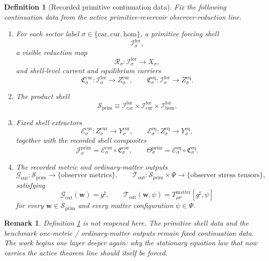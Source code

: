 \documentclass[11pt]{article}
\newcommand{\CompletedMetric}{g^{\sharp}}
\newcommand{\Car}{\mathrm{car}}
\newcommand{\Cur}{\mathrm{cur}}
\newcommand{\Hom}{\mathrm{hom}}
\newcommand{\ForSpace}[1]{\mathcal I_{#1}^{\mathrm{for}}}
\newcommand{\PrimShell}{\mathcal S_{\mathrm{prim}}}
\newcommand{\Reduction}[1]{\mathcal R_{#1}}
\newcommand{\CurrentCarrier}[1]{\mathfrak C_{#1}^{\mathrm{cur}}}
\newcommand{\EqCarrier}[1]{\mathfrak C_{#1}^{\mathrm{eq}}}
\newcommand{\CurrentExtract}[1]{\mathscr E_{#1}^{\mathrm{cur}}}
\newcommand{\EqExtract}[1]{\mathscr E_{#1}^{\mathrm{eq}}}
\newcommand{\PrimCurrent}[1]{\mathcal J_{#1}^{\mathrm{prim}}}
\newcommand{\PrimTheta}[1]{\Theta_{#1}^{\mathrm{prim}}}
\newcommand{\MetricOut}{\mathscr G_{\mathrm{out}}}
\newcommand{\MatterOut}{\mathscr T_{\mathrm{out}}}
\newtheorem{definition}{Definition}
\newtheorem{remark}{Remark}
\begin{document}
\begin{definition}[Recorded primitive continuation data]
\label{def:fixed}
Fix the following continuation data from the active primitive-reservoir observer-reduction line.
\begin{enumerate}
    \item For each sector label \(\sigma\in\{\Car,\Cur,\Hom\}\), a primitive forcing shell
    \[
    \ForSpace{\sigma},
    \]
    a visible reduction map
    \[
    \Reduction{\sigma}:\ForSpace{\sigma}\to X_{\sigma},
    \]
    and shell-level current and equilibrium carriers
    \[
    \CurrentCarrier{\sigma}:\ForSpace{\sigma}\to Z_{\sigma}^{\mathrm{cur}},
    \qquad
    \EqCarrier{\sigma}:\ForSpace{\sigma}\to Z_{\sigma}^{\mathrm{eq}}.
    \]
    \item The product shell
    \[
    \PrimShell
    \equiv
    \ForSpace{\Car}\times \ForSpace{\Cur}\times \ForSpace{\Hom}.
    \]
    \item Fixed shell extractors
    \[
    \CurrentExtract{\sigma}:Z_{\sigma}^{\mathrm{cur}}\to Y_{\sigma}^{\mathrm{cur}},
    \qquad
    \EqExtract{\sigma}:Z_{\sigma}^{\mathrm{eq}}\to Y_{\sigma}^{\mathrm{eq}},
    \]
    together with the recorded shell composites
    \begin{equation}
    \PrimCurrent{\sigma}
    =
    \CurrentExtract{\sigma}\circ \CurrentCarrier{\sigma},
    \qquad
    \PrimTheta{\sigma}
    =
    \EqExtract{\sigma}\circ \EqCarrier{\sigma}.
    \label{eq:primcomposites}
    \end{equation}
    \item The recorded metric and ordinary-matter outputs
    \[
    \MetricOut:\PrimShell\to\{\text{observer metrics}\},
    \qquad
    \MatterOut:\PrimShell\times\Psi\to\{\text{observer stress tensors}\},
    \]
    satisfying
    \begin{equation}
    \MetricOut(\mathbf w)=\CompletedMetric,
    \qquad
    \MatterOut(\mathbf w,\psi)
    =
    T_{\mu\nu}^{\mathrm{matter}}[\CompletedMetric,\psi]
    \label{eq:fixedoutputs}
    \end{equation}
    for every \(\mathbf w\in\PrimShell\) and every matter configuration \(\psi\in\Psi\).
\end{enumerate}
\end{definition}

\begin{remark}
Definition \ref{def:fixed} is not reopened here. The primitive shell data and the benchmark one-metric / ordinary-matter outputs remain fixed continuation data. The work begins one layer deeper again: why the stationary equation law that now carries the active theorem line should itself be forced.
\end{remark}
\end{document}
